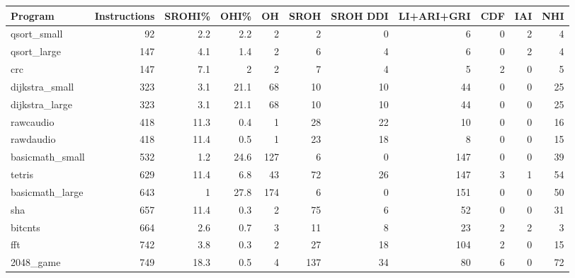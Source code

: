 \begin{tabular}{|l|r|r|r|r|r|r|r|r|r|r|}
\hline
 Program         &   Instructions &   SROHI\% &   OHI\% &   OH &   SROH &   SROH DDI &   LI+ARI+GRI &   CDF &   IAI &   NHI \\
\hline
 qsort\_small     &             92 &      2.2 &    2.2 &    2 &      2 &          0 &            6 &     0 &     2 &     4 \\
\hline
 qsort\_large     &            147 &      4.1 &    1.4 &    2 &      6 &          4 &            6 &     0 &     2 &     4 \\
\hline
 crc             &            147 &      7.1 &    2   &    2 &      7 &          4 &            5 &     2 &     0 &     5 \\
\hline
 dijkstra\_small  &            323 &      3.1 &   21.1 &   68 &     10 &         10 &           44 &     0 &     0 &    25 \\
\hline
 dijkstra\_large  &            323 &      3.1 &   21.1 &   68 &     10 &         10 &           44 &     0 &     0 &    25 \\
\hline
 rawcaudio       &            418 &     11.3 &    0.4 &    1 &     28 &         22 &           10 &     0 &     0 &    16 \\
\hline
 rawdaudio       &            418 &     11.4 &    0.5 &    1 &     23 &         18 &            8 &     0 &     0 &    15 \\
\hline
 basicmath\_small &            532 &      1.2 &   24.6 &  127 &      6 &          0 &          147 &     0 &     0 &    39 \\
\hline
 tetris          &            629 &     11.4 &    6.8 &   43 &     72 &         26 &          147 &     3 &     1 &    54 \\
\hline
 basicmath\_large &            643 &      1   &   27.8 &  174 &      6 &          0 &          151 &     0 &     0 &    50 \\
\hline
 sha             &            657 &     11.4 &    0.3 &    2 &     75 &          6 &           52 &     0 &     0 &    31 \\
\hline
 bitcnts         &            664 &      2.6 &    0.7 &    3 &     11 &          8 &           23 &     2 &     2 &     3 \\
\hline
 fft             &            742 &      3.8 &    0.3 &    2 &     27 &         18 &          104 &     2 &     0 &    15 \\
\hline
 2048\_game       &            749 &     18.3 &    0.5 &    4 &    137 &         34 &           80 &     6 &     0 &    72 \\

\end{tabular}

